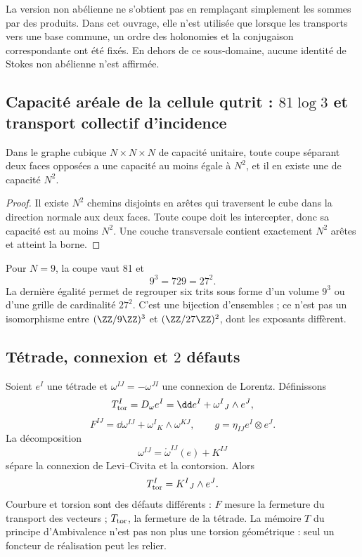 La version non abélienne ne s’obtient pas en remplaçant simplement les sommes par des produits. Dans cet ouvrage, elle n’est utilisée que lorsque les transports vers une base commune, un ordre des holonomies et la conjugaison correspondante ont été fixés. En dehors de ce sous-domaine, aucune identité de Stokes non abélienne n’est affirmée.

\subsection{Capacité aréale de la cellule qutrit : \(81\log 3\) et transport collectif d’incidence}

\begin{theorem}
Dans le graphe cubique \(N\times N\times N\) de capacité unitaire, toute coupe séparant deux faces opposées a une capacité au moins égale à \(N^2\), et il en existe une de capacité \(N^2\).
\end{theorem}
\begin{proof}
Il existe \(N^2\) chemins disjoints en arêtes qui traversent le cube dans la direction normale aux deux faces. Toute coupe doit les intercepter, donc sa capacité est au moins \(N^2\). Une couche transversale contient exactement \(N^2\) arêtes et atteint la borne.
\end{proof}

Pour \(N=9\), la coupe vaut 81 et
\[
 9^3=729=27^2.
\]
La dernière égalité permet de regrouper six trits sous forme d’un volume \(9^3\) ou d’une grille de cardinalité \(27^2\). C’est une bijection d’ensembles ; ce n’est pas un isomorphisme entre \((\ZZ/9\ZZ)^3\) et \((\ZZ/27\ZZ)^2\), dont les exposants diffèrent.

\subsection{Tétrade, connexion et \(2\) défauts}

Soient \(e^I\) une tétrade et \(\omega^{IJ}=-\omega^{JI}\) une connexion de Lorentz. Définissons
\[
 T_{\rm tor}^I=D_\omega e^I
 =\dd e^I+\omega^I{}_J\wedge e^J,
\]
\[
 F^{IJ}=\dd\omega^{IJ}+\omega^I{}_K\wedge\omega^{KJ},
 \qquad
 g=\eta_{IJ}e^I\otimes e^J.
\]
La décomposition
\[
 \omega^{IJ}=\mathring\omega^{IJ}(e)+K^{IJ}
\]
sépare la connexion de Levi--Civita et la contorsion. Alors
\[
 T_{\rm tor}^I=K^I{}_J\wedge e^J.
\]
Courbure et torsion sont des défauts différents : \(F\) mesure la fermeture du transport des vecteurs ; \(T_{\rm tor}\), la fermeture de la tétrade. La mémoire \(T\) du principe d’Ambivalence n’est pas non plus une torsion géométrique : seul un foncteur de réalisation peut les relier.

